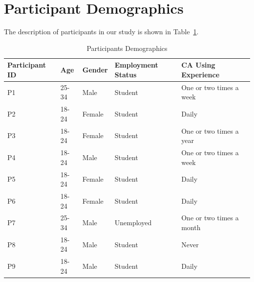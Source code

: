 
\section{Participant Demographics}
\label{appx:participants}
The description of participants in our study is shown in Table~\ref{tab:demographics}.

\begin{table}[t]
\caption{Participants Demographics} 
\label{tab:demographics}
\begin{tabular}{@{}p{2.5cm} p{2cm} p{2.5cm} p{4cm} p{4cm}@{}}
\toprule
\textbf{Participant ID} & \textbf{Age}  & \textbf{Gender}         & \textbf{Employment Status}   & \textbf{CA Using Experience}  \\ \midrule
P1              & 25-34        & Male                    & Student                      & One or two times a week     \\
P2              & 18-24        & Female                  & Student                      & Daily                       \\
P3              & 18-24        & Female                  & Student                      & One or two times a year     \\
P4              & 18-24        & Male                    & Student                      & One or two times a week     \\
P5              & 18-24        & Female                  & Student                      & Daily                       \\
P6              & 18-24        & Female                  & Student                      & Daily                       \\
P7              & 25-34        & Male                    & Unemployed                   & One or two times a month    \\
P8              & 18-24        & Male                    & Student                      & Never                       \\
P9              & 18-24        & Male                    & Student                      & Daily                       \\

\end{tabular}
\end{table}
